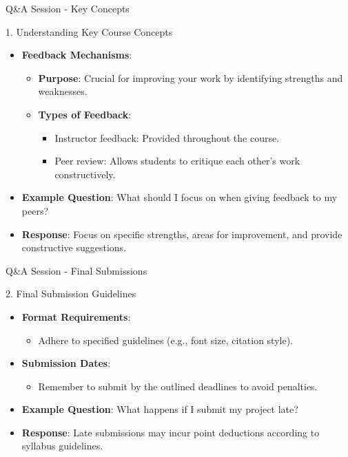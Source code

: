 \documentclass[aspectratio=169]{beamer}
\begin{document}
\begin{frame}[fragile]{Q\&A Session - Key Concepts}
  \begin{block}{1. Understanding Key Course Concepts}
    \begin{itemize}
      \item \textbf{Feedback Mechanisms}:
      \begin{itemize}
        \item \textbf{Purpose}: Crucial for improving your work by identifying strengths and weaknesses.
        \item \textbf{Types of Feedback}:
          \begin{itemize}
            \item Instructor feedback: Provided throughout the course.
            \item Peer review: Allows students to critique each other's work constructively.
          \end{itemize}
      \end{itemize}
      \item \textbf{Example Question}: What should I focus on when giving feedback to my peers?
      \item \textbf{Response}: Focus on specific strengths, areas for improvement, and provide constructive suggestions.
    \end{itemize}
  \end{block}
\end{frame}

\begin{frame}[fragile]{Q\&A Session - Final Submissions}
  \begin{block}{2. Final Submission Guidelines}
    \begin{itemize}
      \item \textbf{Format Requirements}:
        \begin{itemize}
          \item Adhere to specified guidelines (e.g., font size, citation style).
        \end{itemize}
      \item \textbf{Submission Dates}:
        \begin{itemize}
          \item Remember to submit by the outlined deadlines to avoid penalties.
        \end{itemize}
      \item \textbf{Example Question}: What happens if I submit my project late? 
      \item \textbf{Response}: Late submissions may incur point deductions according to syllabus guidelines.
    \end{itemize}
  \end{block}
\end{frame}
\end{document}
